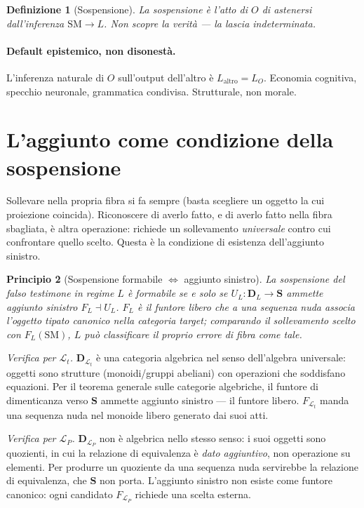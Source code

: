 \documentclass[
    oneside,                 %
    openany,                 %
    titlepage,
    11pt,
    a4paper,
    italian,
    DIV=14,                  %
    headinclude,
    footinclude=true,
    cleardoublepage=empty
]{scrbook}
\theoremstyle{ctplain}
\newtheorem{principio}{Principio}[chapter]
\theoremstyle{ctdef}
\newtheorem{defn}[principio]{Definizione}
\theoremstyle{ctrem}
\newcommand{\Lt}{\mathcal{L}_t}
\newcommand{\LP}{\mathcal{L}_P}
\begin{document}
\begin{defn}[Sospensione]
La \emph{sospensione} è l'atto di $O$ di astenersi dall'inferenza $\mathrm{SM} \to L$. Non scopre la verità --- la lascia indeterminata.
\end{defn}

\paragraph{Default epistemico, non disonestà.} L'inferenza naturale di $O$ sull'output dell'altro è $L_{\text{altro}} = L_O$. Economia cognitiva, specchio neuronale, grammatica condivisa. Strutturale, non morale.

\section*{L'aggiunto come condizione della sospensione}

Sollevare nella propria fibra si fa sempre (basta scegliere un oggetto la cui proiezione coincida). Riconoscere di averlo fatto, e di averlo fatto nella fibra sbagliata, è altra operazione: richiede un sollevamento \emph{universale} contro cui confrontare quello scelto. Questa è la condizione di esistenza dell'aggiunto sinistro.

\begin{principio}[Sospensione formabile $\iff$ aggiunto sinistro]
La sospensione del falso testimone in regime $L$ è formabile se e solo se $U_L : \mathbf{D}_L \to \mathbf{S}$ ammette aggiunto sinistro $F_L \dashv U_L$. $F_L$ è il funtore libero che a una sequenza nuda associa l'oggetto tipato canonico nella categoria target; comparando il sollevamento scelto con $F_L(\mathrm{SM})$, $L$ può classificare il proprio errore di fibra come tale.
\end{principio}

\emph{Verifica per $\Lt$.} $\mathbf{D}_{\Lt}$ è una categoria algebrica nel senso dell'algebra universale: oggetti sono strutture (monoidi/gruppi abeliani) con operazioni che soddisfano equazioni. Per il teorema generale sulle categorie algebriche, il funtore di dimenticanza verso $\mathbf{S}$ ammette aggiunto sinistro --- il funtore libero. $F_{\Lt}$ manda una sequenza nuda nel monoide libero generato dai suoi atti.

\emph{Verifica per $\LP$.} $\mathbf{D}_{\LP}$ non è algebrica nello stesso senso: i suoi oggetti sono quozienti, in cui la relazione di equivalenza è \emph{dato aggiuntivo}, non operazione su elementi. Per produrre un quoziente da una sequenza nuda servirebbe la relazione di equivalenza, che $\mathbf{S}$ non porta. L'aggiunto sinistro non esiste come funtore canonico: ogni candidato $F_{\LP}$ richiede una scelta esterna.
\end{document}
